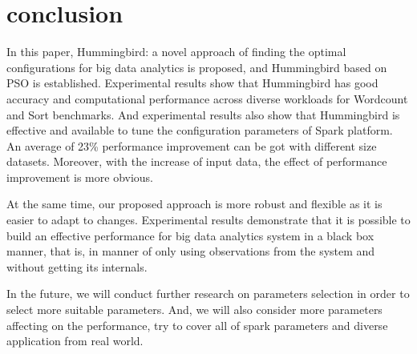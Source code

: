 \section{conclusion}\label{sec:conclusion}
\par In this paper, Hummingbird: a novel approach of finding the optimal configurations for big data analytics is proposed, and Hummingbird  based on PSO  is established.  Experimental results show that Hummingbird has good accuracy and computational performance across diverse workloads for Wordcount and Sort benchmarks. And experimental results also show that Hummingbird is effective and available to tune the configuration parameters of Spark platform. An average of 23\% performance improvement can be got with different size datasets. Moreover, with the increase of input data, the effect of performance improvement is more obvious.
\par At the same time, our proposed approach is more robust and flexible as it is easier to adapt to changes. Experimental results demonstrate that it is possible to build an effective performance for big data analytics system in a black box manner, that is, in manner of only using observations from the system and without getting its internals.
\par In the future, we will conduct further research on parameters selection in order to select more suitable parameters. And, we will also consider more parameters affecting on the performance,  try to cover all of spark parameters and diverse application from real world.
